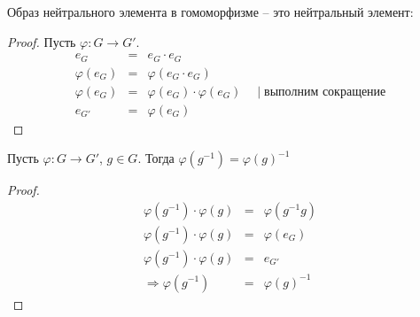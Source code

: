   \begin{theorem-non}
    Образ нейтрального элемента в гомоморфизме -- 
    это нейтральный элемент:
  
    \begin{proof}
      Пусть $\varphi \colon G \to G'$.
      \begin{eqnarray*}
        e_G &=& e_G \cdot e_G \\
        \varphi(e_G) &=& \varphi(e_G \cdot e_G) \\
        \varphi(e_G) &=& \varphi(e_G) \cdot \varphi(e_G)
        \quad \mid \text{выполним сокращение} \\
        e_{G'} &=& \varphi(e_G)
      \end{eqnarray*}
    \end{proof}
  \end{theorem-non}
  
  \begin{theorem-non}
    Пусть $\varphi \colon G \to G'$, $g \in G$.
    Тогда $\varphi(g^{-1}) = \varphi(g)^{-1}$
  
    \begin{proof}
      \begin{eqnarray*}
        \varphi(g^{-1}) \cdot \varphi(g) &=& \varphi(g^{-1}g) \\
        \varphi(g^{-1}) \cdot \varphi(g) &=& \varphi(e_G) \\
        \varphi(g^{-1}) \cdot \varphi(g) &=& e_{G'} \\
        \Rightarrow \varphi(g^{-1}) &=& \varphi(g)^{-1}
      \end{eqnarray*}
    \end{proof}
  \end{theorem-non}
  

